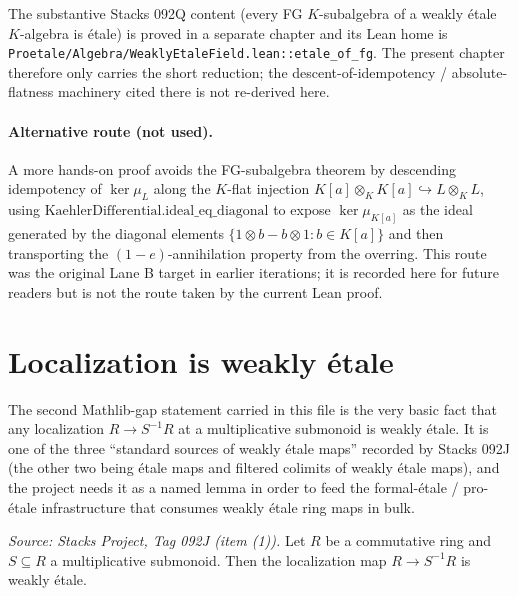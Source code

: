 The substantive Stacks 092Q content (every FG $K$-subalgebra of a
weakly étale $K$-algebra is étale) is proved in a separate chapter and
its Lean home is
\texttt{Proetale/Algebra/WeaklyEtaleField.lean::etale\_of\_fg}. The
present chapter therefore only carries the short reduction; the
descent-of-idempotency / absolute-flatness machinery cited there is not
re-derived here.

\paragraph{Alternative route (not used).}
A more hands-on proof avoids the FG-subalgebra theorem by descending
idempotency of $\ker \mu_L$ along the $K$-flat injection
$K[a] \otimes_K K[a] \hookrightarrow L \otimes_K L$, using
$\mathrm{KaehlerDifferential.ideal\_eq\_diagonal}$ to expose
$\ker \mu_{K[a]}$ as the ideal generated by the diagonal elements
$\{1 \otimes b - b \otimes 1 : b \in K[a]\}$ and then transporting the
$(1-e)$-annihilation property from the overring. This route was the
original Lane B target in earlier iterations; it is recorded here for
future readers but is not the route taken by the current Lean proof.

\section{Localization is weakly étale}

The second Mathlib-gap statement carried in this file is the very basic
fact that any localization $R \to S^{-1} R$ at a multiplicative submonoid
is weakly étale. It is one of the three ``standard sources of weakly
étale maps'' recorded by Stacks 092J (the other two being étale maps and
filtered colimits of weakly étale maps), and the project needs it as a
named lemma in order to feed the formal-étale / pro-étale infrastructure
that consumes weakly étale ring maps in bulk.

\begin{lemma}
  \label{lem:weaklyEtale-localization}
  \textit{Source: Stacks Project, Tag 092J (item (1)).}
  Let $R$ be a commutative ring and $S \subseteq R$ a multiplicative
  submonoid. Then the localization map $R \to S^{-1} R$ is weakly étale.
\end{lemma}

